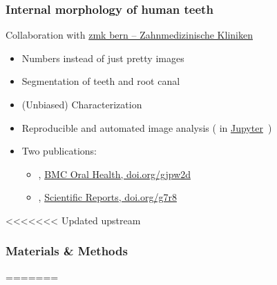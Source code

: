 \begin{frame}
	\frametitle{Internal morphology of human teeth}%
	Collaboration with \href{https://www.zmk.unibe.ch/}{zmk bern – Zahnmedizinische Kliniken}%
	\begin{itemize}%
		\item Numbers instead of just pretty images%
		\item Segmentation of teeth and root canal%
		\item (Unbiased) Characterization%
		\item Reproducible and automated image analysis (\href{https://www.python.org/}{\faPython} in \href{https://jupyter.org/}{Jupyter}~\cite{Kluyver2016})%
		\item Two publications:%
		\begin{itemize}%
			\item \cite{Haberthuer2021}, \href{https://bmcoralhealth.biomedcentral.com/articles/10.1186/s12903-021-01551-x}{BMC Oral Health, doi.org/gjpw2d}%
			\item \cite{Wolf2021}, \href{https://www.nature.com/articles/s41598-021-00758-w}{Scientific Reports, doi.org/g7r8}%
		\end{itemize}%
	\end{itemize}%
\end{frame}

<<<<<<< Updated upstream
\subsubsection{Materials \& Methods}
=======
